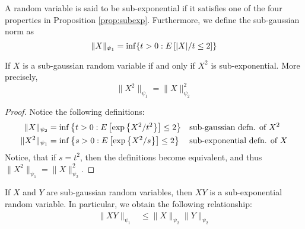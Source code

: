 \begin{tcolorbox}
\begin{definition}
A random variable is said to be sub-exponential if it satisfies one of the four properties in Proposition \ref{prop:subexp}. Furthermore, we define the sub-gaussian norm as 
\begin{equation}
    \|X\|_{\psi_1} = \inf\{t > 0: E\left[|X|/t \leq 2 \right]\}
\end{equation}
\end{definition}
\end{tcolorbox}


\begin{tcolorbox}
\begin{lemma}
If $X$ is a sub-gaussian random variable if and only if $X^2$ is sub-exponential. More precisely,
$$\|X^2\|_{\psi_1} = \|X\|_{\psi_2}^2$$
\end{lemma}
\end{tcolorbox}

\begin{proof}
Notice the following definitions:
\begin{align*}
    \|X\|_{\psi_2} &= \inf\left\{ t > 0: E\left[\exp\left\{X^2/t^2 \right\} \right]\leq 2 \right\}  && \text{sub-gaussian defn. of $X^2$} \\
    \|X^2\|_{\psi_1} &= \inf\left\{ s > 0: E\left[\exp\left\{X^2/s \right\} \right]\leq 2 \right\}  && \text{sub-exponential defn. of $X$} 
\end{align*}
Notice, that if $s = t^2$, then the definitions become equivalent, and thus $\|X^2\|_{\psi_1} = \|X\|_{\psi_2}^2.$
\end{proof}


\begin{tcolorbox}
\begin{lemma}
If $X$ and $Y$ are sub-gaussian random variables, then $XY$ is a sub-exponential random variable. In particular, we obtain the following relationship:
\begin{align*}
    \|XY\|_{\psi_1} &\leq \|X\|_{\psi_2} \|Y\|_{\psi_2} \\ 
\end{align*}
\end{lemma}
\end{tcolorbox}

